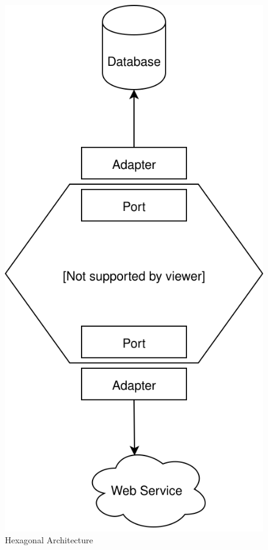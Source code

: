 \begin{figure}
\centering
\includegraphics{img/design-for-testability/hexagonal_architecture.svg}
\caption{Hexagonal Architecture}
\end{figure}

